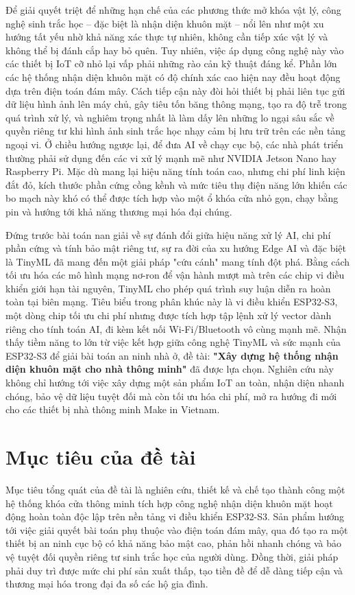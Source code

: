Để giải quyết triệt để những hạn chế của các phương thức mở khóa vật lý, công nghệ sinh trắc học – đặc biệt là nhận diện khuôn mặt – nổi lên như một xu hướng tất yếu nhờ khả năng xác thực tự nhiên, không cần tiếp xúc vật lý và không thể bị đánh cắp hay bỏ quên. Tuy nhiên, việc áp dụng công nghệ này vào các thiết bị IoT cỡ nhỏ lại vấp phải những rào cản kỹ thuật đáng kể. Phần lớn các hệ thống nhận diện khuôn mặt có độ chính xác cao hiện nay đều hoạt động dựa trên điện toán đám mây. Cách tiếp cận này đòi hỏi thiết bị phải liên tục gửi dữ liệu hình ảnh lên máy chủ, gây tiêu tốn băng thông mạng, tạo ra độ trễ  trong quá trình xử lý, và nghiêm trọng nhất là làm dấy lên những lo ngại sâu sắc về quyền riêng tư khi hình ảnh sinh trắc học nhạy cảm bị lưu trữ trên các nền tảng ngoại vi. Ở chiều hướng ngược lại, để đưa AI về chạy cục bộ, các nhà phát triển thường phải sử dụng đến các vi xử lý mạnh mẽ như NVIDIA Jetson Nano hay Raspberry Pi. Mặc dù mang lại hiệu năng tính toán cao, nhưng chi phí linh kiện đắt đỏ, kích thước phần cứng cồng kềnh và mức tiêu thụ điện năng lớn khiến các bo mạch này khó có thể được tích hợp vào một ổ khóa cửa nhỏ gọn, chạy bằng pin và hướng tới khả năng thương mại hóa đại chúng.

Đứng trước bài toán nan giải về sự đánh đổi giữa hiệu năng xử lý AI, chi phí phần cứng và tính bảo mật riêng tư, sự ra đời của xu hướng Edge AI và đặc biệt là TinyML đã mang đến một giải pháp "cứu cánh" mang tính đột phá. Bằng cách tối ưu hóa các mô hình mạng nơ-ron để vận hành mượt mà trên các chip vi điều khiển giới hạn tài nguyên, TinyML cho phép quá trình suy luận diễn ra hoàn toàn tại biên mạng. Tiêu biểu trong phân khúc này là vi điều khiển ESP32-S3, một dòng chip tối ưu chi phí nhưng được tích hợp tập lệnh xử lý vector dành riêng cho tính toán AI, đi kèm kết nối Wi-Fi/Bluetooth vô cùng mạnh mẽ. Nhận thấy tiềm năng to lớn từ việc kết hợp giữa công nghệ TinyML và sức mạnh của ESP32-S3 để giải bài toán an ninh nhà ở, đề tài: \textbf{"Xây dựng hệ thống nhận diện khuôn mặt cho nhà thông minh"} đã được lựa chọn. Nghiên cứu này không chỉ hướng tới việc xây dựng một sản phẩm IoT an toàn, nhận diện nhanh chóng, bảo vệ dữ liệu tuyệt đối mà còn tối ưu hóa chi phí, mở ra hướng đi mới cho các thiết bị nhà thông minh Make in Vietnam.
\section{Mục tiêu của đề tài}
Mục tiêu tổng quát của đề tài là nghiên cứu, thiết kế và chế tạo thành công một hệ thống khóa cửa thông minh tích hợp công nghệ nhận diện khuôn mặt hoạt động hoàn toàn độc lập trên nền tảng vi điều khiển ESP32-S3. Sản phẩm hướng tới việc giải quyết bài toán phụ thuộc vào điện toán đám mây, qua đó tạo ra một thiết bị an ninh cục bộ có khả năng bảo mật cao, phản hồi nhanh chóng và bảo vệ tuyệt đối quyền riêng tư sinh trắc học của người dùng. Đồng thời, giải pháp phải duy trì được mức chi phí sản xuất thấp, tạo tiền đề để dễ dàng tiếp cận và thương mại hóa trong đại đa số các hộ gia đình.


